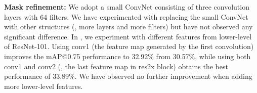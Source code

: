 \begin{table}[!t]
  \centering
  \caption{Effect of different numbers of directions (\ie, how many directions for quantizing the 360 degree) when using four bins for distance quantization.}
  \label{tab:direction_effect}
\end{table}






\textbf{Mask refinement:} We adopt a small ConvNet consisting of three  convolution layers with 64 filters. We have experimented with replacing the small ConvNet with other structures (\eg, more layers and more filters) but have not observed any significant difference. In , we experiment with different features from lower-level of ResNet-101. Using conv1 (the feature map generated by the first convolution) improves the mAP@0.75 performance to 32.92\% from 30.57\%, while using both conv1 and conv2 (\ie, the last feature map in res2x block) obtains the best performance of 33.89\%. We have observed no further improvement when adding more lower-level features.

\begin{table}[!t]
  \centering
  \caption{Mask refinement. The best performance is obtained when using features from conv1 and conv2 (\ie, last feature map in res2x block). Note conv3 denotes the last feature map in res3x block.}
  \label{tab:refine_mask}
\end{table}


